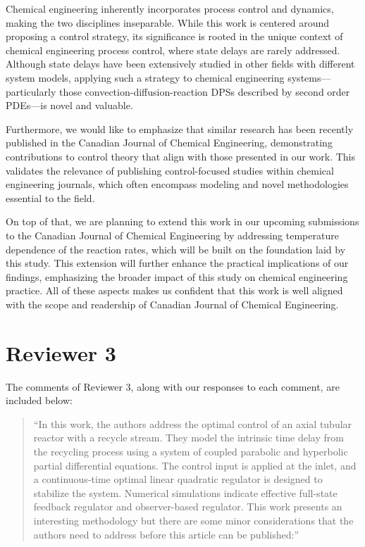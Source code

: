 \documentclass[12pt,answers]{exam}
\begin{document}
\begin{questions}
\begin{solutionorbox}
        Chemical engineering inherently incorporates process control and dynamics, making the two disciplines inseparable. While this work is centered around proposing a control strategy, its significance is rooted in the unique context of chemical engineering process control, where state delays are rarely addressed. Although state delays have been extensively studied in other fields with different system models, applying such a strategy to chemical engineering systems—particularly those convection-diffusion-reaction DPSs described by second order PDEs—is novel and valuable. 
        
        Furthermore, we would like to emphasize that similar research \cite{li2024novel, azhin2021modelling} has been recently published in the Canadian Journal of Chemical Engineering, demonstrating contributions to control theory that align with those presented in our work. This validates the relevance of publishing control-focused studies within chemical engineering journals, which often encompass modeling and novel methodologies essential to the field.

        On top of that, we are planning to extend this work in our upcoming submissions to the Canadian Journal of Chemical Engineering by addressing temperature dependence of the reaction rates, which will be built on the foundation laid by this study. This extension will further enhance the practical implications of our findings, emphasizing the broader impact of this study on chemical engineering practice. All of these aspects makes us confident that this work is well aligned with the scope and readership of Canadian Journal of Chemical Engineering.
    \end{solutionorbox}

\end{questions}

\newpage
\section*{Reviewer 3}

The comments of Reviewer 3, along with our responses to each comment, are included below:

\begin{quote}
    ``In this work, the authors address the optimal control of an axial tubular reactor with a recycle stream. They model the intrinsic time delay from the recycling process using a system of coupled parabolic and hyperbolic partial differential equations. The control input is applied at the inlet, and a continuous-time optimal linear quadratic regulator is designed to stabilize the system. Numerical simulations indicate effective full-state feedback regulator and observer-based regulator. This work presents an interesting methodology but there are some minor considerations that the authors need to address before this article can be published:''
\end{quote}
\end{document}
